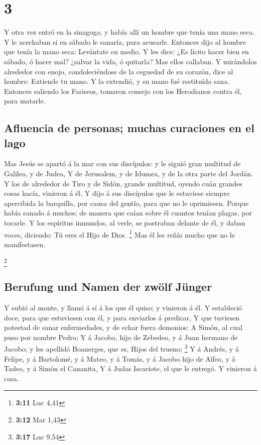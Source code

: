 \hypertarget{section-2}{%
\section{3}\label{section-2}}

 Y otra vez entró en la sinagoga; y había allí un hombre que
tenía una mano seca.  Y le acechaban si en sábado le
sanaría, para acusarle.  Entonces dijo al hombre que tenía
la mano seca: Levántate en medio.  Y les dice: ¿Es lícito
hacer bien en sábado, ó hacer mal? ¿salvar la vida, ó quitarla? Mas
ellos callaban.  Y mirándolos alrededor con enojo,
condoleciéndose de la ceguedad de su corazón, dice al hombre: Extiende
tu mano. Y la extendió, y su mano fué restituída sana. 
Entonces saliendo los Fariseos, tomaron consejo con los Herodianos
contra él, para matarle.

\hypertarget{afluencia-de-personas-muchas-curaciones-en-el-lago}{%
\subsection{Afluencia de personas; muchas curaciones en el
lago}\label{afluencia-de-personas-muchas-curaciones-en-el-lago}}

 Mas Jesús se apartó á la mar con sus discípulos: y le
siguió gran multitud de Galilea, y de Judea,  Y de
Jerusalem, y de Idumea, y de la otra parte del Jordán. Y los de
alrededor de Tiro y de Sidón, grande multitud, oyendo cuán grandes cosas
hacía, vinieron á él.  Y dijo á sus discípulos que le
estuviese siempre apercibida la barquilla, por causa del gentío, para
que no le oprimiesen.  Porque había sanado á muchos; de
manera que caían sobre él cuantos tenían plagas, por tocarle.
 Y los espíritus inmundos, al verle, se postraban delante
de él, y daban voces, diciendo: Tú eres el Hijo de Dios. \footnote{\textbf{3:11}
  Luc 4,41}  Mas él les reñía mucho que no le manifestasen.

\footnote{\textbf{3:12} Mar 1,43}

\hypertarget{berufung-und-namen-der-zwuxf6lf-juxfcnger}{%
\subsection{Berufung und Namen der zwölf
Jünger}\label{berufung-und-namen-der-zwuxf6lf-juxfcnger}}

 Y subió al monte, y llamó á sí á los que él quiso; y
vinieron á él.  Y estableció doce, para que estuviesen con
él, y para enviarlos á predicar,  Y que tuviesen potestad
de sanar enfermedades, y de echar fuera demonios:  A Simón,
al cual puso por nombre Pedro;  Y á Jacobo, hijo de
Zebedeo, y á Juan hermano de Jacobo; y les apellidó Boanerges, que es,
Hijos del trueno; \footnote{\textbf{3:17} Luc 9,54}  Y á
Andrés, y á Felipe, y á Bartolomé, y á Mateo, y á Tomás, y á Jacobo hijo
de Alfeo, y á Tadeo, y á Simón el Cananita,  Y á Judas
Iscariote, el que le entregó. Y vinieron á casa.

